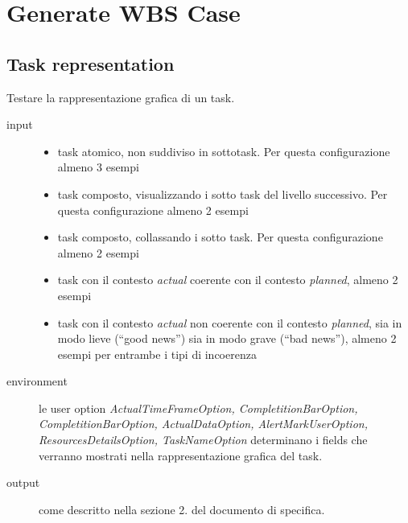\chapter{Generate WBS Case}
\label{chap:generateWBS}

\section{Task representation}
Testare la rappresentazione grafica di un task.
\begin{description}
\item[input] 
\quad
\begin{itemize}
  \item task atomico, non suddiviso in sottotask. Per questa configurazione
  almeno 3 esempi
  \item task composto, visualizzando i sotto task del livello successivo. Per
  questa configurazione almeno 2 esempi
  \item task composto, collassando i sotto task.  Per questa configurazione
  almeno 2 esempi
  \item task con il contesto \emph{actual} coerente con il contesto
  \emph{planned}, almeno 2 esempi
  \item task con il contesto \emph{actual} non coerente con il contesto
  \emph{planned}, sia in modo lieve (``good news'') sia in modo grave (``bad
  news''), almeno 2 esempi per entrambe i tipi di incoerenza
\end{itemize}
\item[environment] le user option
\emph{ActualTimeFrameOption, CompletitionBarOption, CompletitionBarOption, 
ActualDataOption, AlertMarkUserOption, ResourcesDetailsOption, TaskNameOption}
determinano i fields che verranno mostrati nella rappresentazione grafica del task.
\item[output] come descritto nella sezione 2. del documento di specifica.
\end{description}

